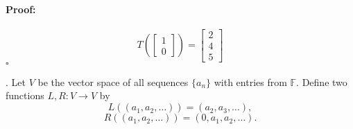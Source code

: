\documentclass[12pt]{article}
\newcommand{\F}{\mathbb{F}}
\newenvironment{proof}{\paragraph{Proof:}}{\hfill$\square$}
\begin{document}
\begin{enumerate}[(a)]
    \begin{proof}
        $$
        T(\begin{bmatrix}
            1\\0
        \end{bmatrix})
        =
        \begin{bmatrix}
            2\\4\\5
        \end{bmatrix}    $$
    \end{proof}
    
    \end{enumerate}
    
    \newpage
    
    
    .  Let $V$ be the vector space of all sequences $\{a_n\}$ with entries from $\F$.  Define two functions $L, R: V \rightarrow V$ by
    \[ L ((a_1, a_2, \dots)) = (a_2, a_3, \dots),\]
    \[ R((a_1, a_2, \dots)) = (0, a_1, a_2, \dots).\]
\end{document}

